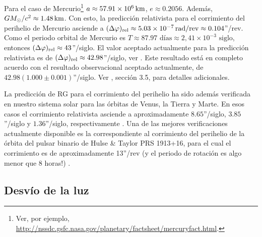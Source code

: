 Para el caso de Mercurio\footnote{Ver, por ejemplo, \url{http://nssdc.gsfc.nasa.gov/planetary/factsheet/mercuryfact.html}.}  $a\approx 57.91\times 10^6\text{\,km}$, $e\approx 0.2056$. Además, $GM_\odot/c^2\approx 1.48\text{\,km}$. Con esto, la predicción relativista para el corrimiento del perihelio de Mercurio asciende a $(\Delta\varphi)_{\rm rel}\approx 5.03\times 10^{-7}{\,\rm rad/rev}\approx 0.104$''/rev. Como el periodo orbital de Mercurio es $T\approx 87.97\text{ días}\approx 2,41\times 10^{-3}\text{ siglo}$, entonces  $(\Delta\varphi)_{\rm rel}\approx 43$''/siglo. El valor aceptado actualmente para la predicción relativista es de $(\Delta\varphi)_{\rm rel}\approx 42.98$''/siglo, ver \cite{NW86}. Este resultado está en completo acuerdo con el resultado observacional aceptado actualmente, de $42.98(1.000\pm 0.001)$''/siglo. Ver \cite{Will06}, sección 3.5, para detalles adicionales.

La predicción de RG para el corrimiento del perihelio ha sido además verificada en nuestro sistema solar para las órbitas de Venus, la Tierra y Marte. En esos casos el corrimiento relativista asciende a aproximadamente $8.65$''/siglo, $3.85$''/siglo y $1.36$''/siglo, respectivamente \cite{OR94}. Una de las mejores verificaciones actualmente disponible es la correspondiente al corrimiento del perihelio de la órbita del pulsar binario de Hulse \& Taylor PRS 1913+16, para el cual el corrimiento es de aproximadamente 13''/rev (y el periodo de rotación es algo menor que 8 horas!) \cite{Taylor93}.

\subsection{Desvío de la luz}


